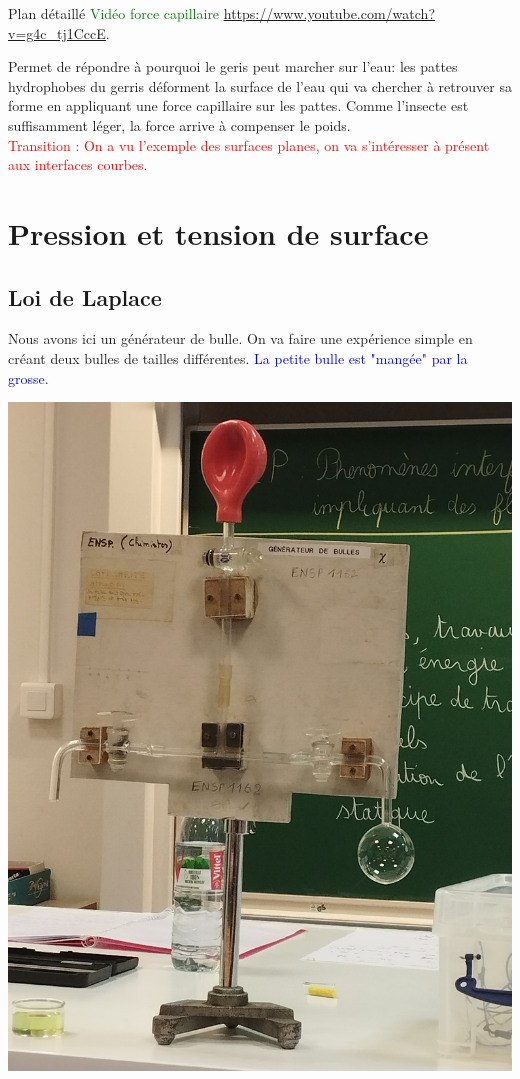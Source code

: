 \begin{reportBlock}{Plan détaillé}
  \textcolor{green}{Vidéo force capillaire }\url{https://www.youtube.com/watch?v=g4c_tj1CccE}.
  
  Permet de répondre à pourquoi le geris peut marcher sur l'eau: les pattes hydrophobes du gerris déforment la surface de l'eau qui va chercher à retrouver sa forme en appliquant une force capillaire sur les pattes. Comme l'insecte est suffisamment léger, la force arrive à compenser le poids. \\

  \textcolor{red}{Transition : On a vu l'exemple des surfaces planes, on va s'intéresser à présent aux interfaces courbes.}
  
 \section{Pression et tension de surface}
 
 \subsection{Loi de Laplace}
 Nous avons ici un générateur de bulle. On va faire une expérience simple en créant deux bulles de tailles différentes. \textcolor{blue}{La petite bulle est "mangée" par la grosse.}
 \begin{center}
     \includegraphics[scale=0.1]{LP_TensionSurface/Manip_Laplace.jpg}
     

\end{center}
\end{reportBlock}
